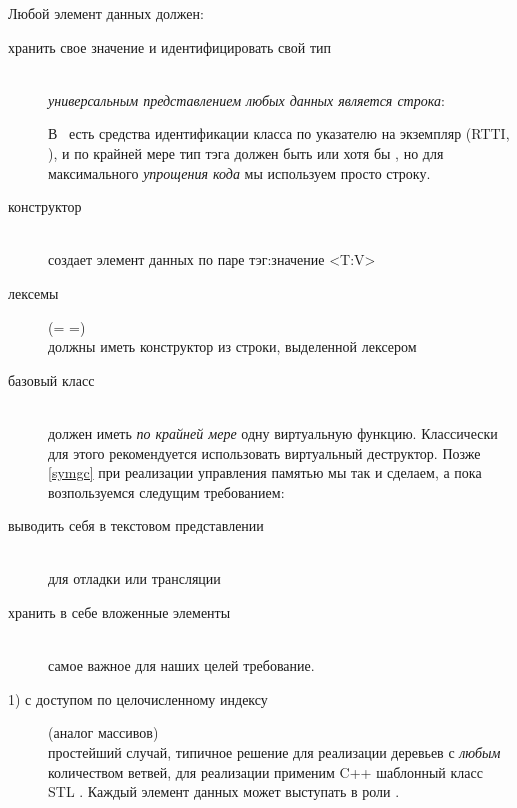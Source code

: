 \clearpage
Любой элемент данных должен:
\begin{description}
\item[хранить свое значение и идентифицировать свой тип]\ \\\emph{универсальным
представлением любых данных является строка}:

В \cpp\ есть средства идентификации класса по указателю на экземпляр (RTTI,
), и по крайней мере тип тэга должен быть  или
хотя бы , но для максимального \emph{упрощения кода} мы
используем просто строку.

\item[конструктор]\ \\создает элемент данных по паре тэг:значение <T:V>
\item[лексемы] (= =)\ \\должны иметь конструктор из
строки, выделенной лексером
\clearpage
\item[базовый класс]\ \\должен иметь \emph{по крайней мере} одну виртуальную
функцию. Классически для этого рекомендуется использовать виртуальный
деструктор. Позже \ref{symgc} при реализации управления памятью мы так и
сделаем, а пока возпользуемся следущим требованием:
\item[выводить себя в текстовом представлении]\ \\для отладки или трансляции

\item[хранить в себе вложенные элементы]\ \\самое важное для наших целей
требование. 

\item[1) с доступом по целочисленному индексу] (аналог массивов)\ \\
простейший случай, типичное решение для реализации деревьев с \emph{любым}
количеством ветвей, для реализации применим C++ шаблонный класс STL
. Каждый элемент данных может выступать в роли .


\end{description}

